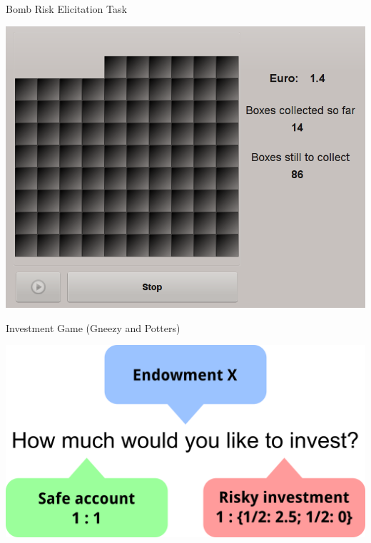 \documentclass[
  ignorenonframetext,
]{beamer}
\begin{document}
\begin{frame}{Bomb Risk Elicitation Task}
\protect\hypertarget{bomb-risk-elicitation-task}{}

\includegraphics{BRET.png}

\end{frame}

\begin{frame}{Investment Game (Gneezy and Potters)}
\protect\hypertarget{investment-game-gneezy-and-potters}{}

\includegraphics[width=6.25in,height=\textheight]{CGP.png}

\end{frame}
\end{document}
